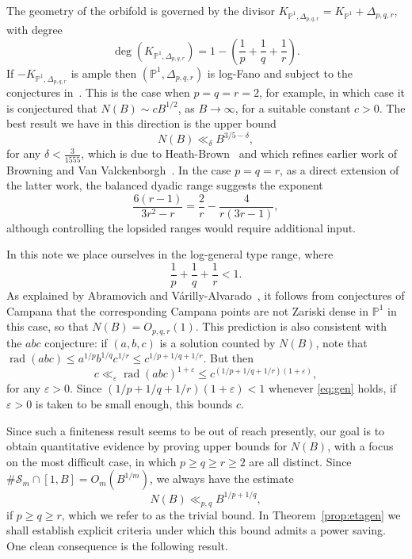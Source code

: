 \documentclass[a4paper,11pt,twoside,reqno]{amsart}
\theoremstyle{definition}
\theoremstyle{remark}
\numberwithin{equation}{section}
\newcommand\ve{\varepsilon}
\newcommand\PP{\mathbb{P}}
\newcommand\1{\mathbf{1}}
\DeclareMathOperator\rad{rad}
\renewcommand{\leq}{\leqslant}
\renewcommand{\geq}{\geqslant}
\begin{document}
The geometry of the orbifold is governed by
the divisor 
$K_{\PP^1,\Delta_{p,q,r}}=K_{\PP^1}+\Delta_{p,q,r}$, with degree
\[
\deg(K_{\PP^1,\Delta_{p,q,r}})
 =
 1-\left(\frac1p+\frac1q+\frac1r\right).
\]
If $-K_{\PP^1,\Delta_{p,q,r}}$ is ample then 
 $(\PP^1,\Delta_{p,q,r})$ is log-Fano and subject to the conjectures in~\cite{chow,c-manin}.
This is the case when $p=q=r=2$, for example, in which case 
it is conjectured that $N(B)\sim c B^{1/2}$, as $B\to \infty$, for a suitable constant $c>0$. 
The best result we have in this direction is the upper bound 
\[
N(B)\ll_\delta B^{3/5-\delta},
\] 
for any $\delta<\frac{3}{1555}$, which is due to Heath-Brown~\cite{HB-squarefull} and which refines earlier work of 
Browning and Van Valckenborgh~\cite{squareful}. 
In the case $p=q=r$, 
as a direct extension of the latter work, 
the balanced dyadic range suggests the exponent
\[
\frac{6(r-1)}{3r^2-r}
=
\frac2r-\frac{4}{r(3r-1)},
\]
although 
controlling the lopsided ranges would require additional
input.

In this note we place ourselves in the log-general type range, where
\begin{equation}\label{eq:gen}
\frac1p+\frac1q+\frac1r<1.
\end{equation}
As explained by Abramovich and Várilly-Alvarado~\cite[Conjecture 1.2]{alvarado}, 
it follows from conjectures of 
Campana that the corresponding Campana points
are not Zariski dense in $\PP^1$ in this case, so that $N(B)=O_{p,q,r}(1)$.
This prediction is also consistent with
the $abc$ conjecture: if $(a,b,c)$ is a solution counted by $N(B)$, 
note that $\rad(abc)\leq a^{1/p}b^{1/q}c^{1/r}\leq c^{1/p+1/q+1/r}$.
But then 
\[
c\ll_\varepsilon \rad(abc)^{1+\varepsilon}
 \leq c^{(1/p+1/q+1/r)(1+\varepsilon)},
\]
for any $\ve>0$. 
Since $(1/p+1/q+1/r)(1+\varepsilon)<1$ 
 whenever 
\eqref{eq:gen} holds, 
if $\ve>0$ 
is taken to be small enough, 
this bounds $c$.

Since such a finiteness result seems to be out of reach presently, 
our goal is to obtain quantitative evidence by proving upper 
bounds for $N(B)$, with 
a focus on the most difficult case, in which $p\geq q\geq r\geq 2$ are all distinct.
Since
$\#\mathcal S_m\cap[1,B]=O_m(B^{1/m})$, we always have the
estimate 
\begin{equation}\label{eq:triv}
N(B)\ll_{p,q}B^{1/p+1/q},
\end{equation}
if $p\geq q\geq r$, 
which we refer to as the trivial bound. 
In Theorem~\ref{prop:etagen}
we shall establish explicit criteria under which this bound admits a power
saving. One clean consequence is the following result.
\end{document}
